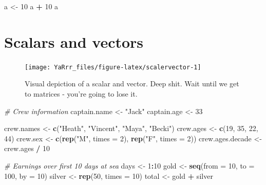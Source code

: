 \documentclass[]{book}
\newenvironment{Shaded}{\begin{snugshade}}{\end{snugshade}}
\newcommand{\KeywordTok}[1]{\textcolor[rgb]{0.13,0.29,0.53}{\textbf{#1}}}
\newcommand{\DataTypeTok}[1]{\textcolor[rgb]{0.13,0.29,0.53}{#1}}
\newcommand{\DecValTok}[1]{\textcolor[rgb]{0.00,0.00,0.81}{#1}}
\newcommand{\StringTok}[1]{\textcolor[rgb]{0.31,0.60,0.02}{#1}}
\newcommand{\CommentTok}[1]{\textcolor[rgb]{0.56,0.35,0.01}{\textit{#1}}}
\newcommand{\OperatorTok}[1]{\textcolor[rgb]{0.81,0.36,0.00}{\textbf{#1}}}
\newcommand{\NormalTok}[1]{#1}
\theoremstyle{definition}
\theoremstyle{definition}
\theoremstyle{remark}
\begin{document}
\begin{Shaded}
\begin{Highlighting}[]
\NormalTok{a <-}\StringTok{ }\DecValTok{10}
\NormalTok{a }\OperatorTok{+}\StringTok{ }\DecValTok{10}
\NormalTok{a}
\end{Highlighting}
\end{Shaded}

\chapter{Scalars and vectors}\label{scalersvectors}

\begin{figure}

{\centering \texttt{[image: YaRrr\_files/figure-latex/scalervector-1]} 

}

\caption{Visual depiction of a scalar and vector. Deep shit. Wait until we get to matrices - you're going to lose it.}\label{fig:scalervector}
\end{figure}

\begin{Shaded}
\begin{Highlighting}[]
\CommentTok{# Crew information}
\NormalTok{captain.name <-}\StringTok{ "Jack"}
\NormalTok{captain.age <-}\StringTok{ }\DecValTok{33}

\NormalTok{crew.names <-}\StringTok{ }\KeywordTok{c}\NormalTok{(}\StringTok{"Heath"}\NormalTok{, }\StringTok{"Vincent"}\NormalTok{, }\StringTok{"Maya"}\NormalTok{, }\StringTok{"Becki"}\NormalTok{)}
\NormalTok{crew.ages <-}\StringTok{ }\KeywordTok{c}\NormalTok{(}\DecValTok{19}\NormalTok{, }\DecValTok{35}\NormalTok{, }\DecValTok{22}\NormalTok{, }\DecValTok{44}\NormalTok{)}
\NormalTok{crew.sex <-}\StringTok{ }\KeywordTok{c}\NormalTok{(}\KeywordTok{rep}\NormalTok{(}\StringTok{"M"}\NormalTok{, }\DataTypeTok{times =} \DecValTok{2}\NormalTok{), }\KeywordTok{rep}\NormalTok{(}\StringTok{"F"}\NormalTok{, }\DataTypeTok{times =} \DecValTok{2}\NormalTok{))}
\NormalTok{crew.ages.decade <-}\StringTok{ }\NormalTok{crew.ages }\OperatorTok{/}\StringTok{ }\DecValTok{10}

\CommentTok{# Earnings over first 10 days at sea}
\NormalTok{days <-}\StringTok{ }\DecValTok{1}\OperatorTok{:}\DecValTok{10}
\NormalTok{gold <-}\StringTok{ }\KeywordTok{seq}\NormalTok{(}\DataTypeTok{from =} \DecValTok{10}\NormalTok{, }\DataTypeTok{to =} \DecValTok{100}\NormalTok{, }\DataTypeTok{by =} \DecValTok{10}\NormalTok{)}
\NormalTok{silver <-}\StringTok{ }\KeywordTok{rep}\NormalTok{(}\DecValTok{50}\NormalTok{, }\DataTypeTok{times =} \DecValTok{10}\NormalTok{)}
\NormalTok{total <-}\StringTok{ }\NormalTok{gold }\OperatorTok{+}\StringTok{ }\NormalTok{silver}
\end{Highlighting}
\end{Shaded}
\end{document}
